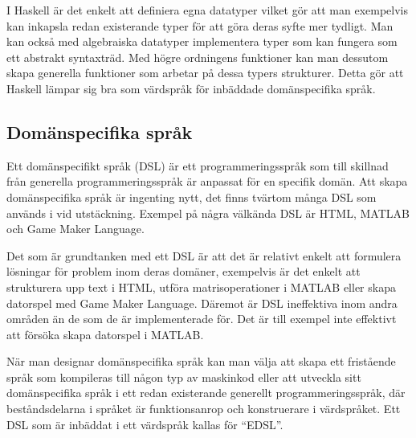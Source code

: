 \documentclass[12pt,a4paper,twoside,openright]{article}
\begin{document}
I Haskell är det enkelt att definiera egna datatyper vilket gör att
man exempelvis kan inkapsla redan existerande typer för att göra deras
syfte mer tydligt. Man kan också med algebraiska datatyper
implementera typer som kan fungera som ett abstrakt syntaxträd. Med
högre ordningens funktioner kan man dessutom skapa generella
funktioner som arbetar på dessa typers strukturer. Detta gör att
Haskell lämpar sig bra som värdspråk för inbäddade domänspecifika
språk.

\subsection{Domänspecifika språk}
Ett domänspecifikt språk (\gls{DSL}) är ett programmeringsspråk som
till skillnad från generella programmeringsspråk är anpassat för en
specifik domän. Att skapa domänspecifika språk är ingenting nytt, det
finns tvärtom många DSL som används i vid utstäckning.
Exempel på några välkända DSL är HTML, MATLAB och Game Maker
Language.

Det som är grundtanken med ett DSL är att det är relativt enkelt att
formulera lösningar för problem inom deras domäner, exempelvis är det
enkelt att strukturera upp text i HTML, utföra matrisoperationer i
MATLAB eller skapa datorspel med Game Maker Language. Däremot är DSL
ineffektiva inom andra områden än de som de är implementerade för.
Det är till exempel inte effektivt att försöka skapa datorspel i
MATLAB.

När man designar domänspecifika språk kan man välja att skapa ett
fristående språk som kompileras till någon typ av maskinkod eller att
utveckla sitt domänspecifika språk i ett redan existerande generellt
programmeringsspråk, där beståndsdelarna i språket är funktionsanrop
och konstruerare i värdspråket. Ett DSL som är inbäddat i ett
värdspråk kallas för ``\gls{EDSL}''.
\end{document}
